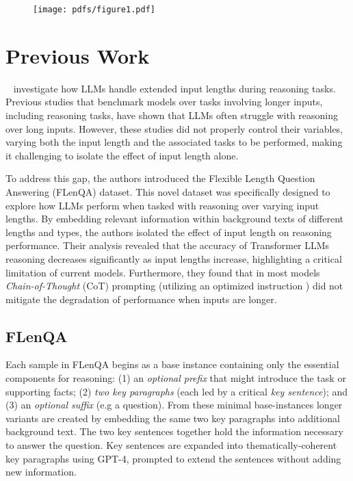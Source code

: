 \documentclass[11pt]{article}
\begin{document}
\begin{figure}\centering\texttt{[image: pdfs/figure1.pdf]}\end{figure}


\section{Previous Work}
~\citealp{levy-etal-2024-task} investigate how LLMs handle extended input lengths during reasoning tasks. Previous studies that benchmark models over tasks involving longer inputs, including reasoning tasks, have shown that LLMs often struggle with reasoning over long inputs. However, these studies did not properly control their variables, varying both the input length and the associated tasks to be performed, making it challenging to isolate the effect of input length alone.

To address this gap, the authors introduced the Flexible Length Question Answering (FLenQA) dataset. This novel dataset was specifically designed to explore how LLMs perform when tasked with reasoning over varying input lengths. By embedding relevant information within background texts of different lengths and types, the authors isolated the effect of input length on reasoning performance. Their analysis revealed that the accuracy of Transformer LLMs reasoning decreases significantly as input lengths increase, highlighting a critical limitation of current models.
Furthermore, they found that in most models \textit{Chain-of-Thought} (CoT) prompting \citep{kojima2022large,wei2022chain} (utilizing an optimized instruction \citep{zhou2022large}) did not mitigate the degradation of performance when inputs are longer.

\subsection{FLenQA}
Each sample in FLenQA begins as a base instance containing only the essential components for reasoning: (1) an \emph{optional prefix} that might introduce the task or supporting facts; (2) \emph{two key paragraphs} (each led by a critical \emph{key sentence}); and (3) an \emph{optional suffix} (e.g a question). From these minimal base-instances longer variants are created by embedding the same two key paragraphs into additional background text.
The two key sentences together hold the information necessary to answer the question.
Key sentences are expanded into thematically-coherent key paragraphs using GPT-4, prompted to extend the sentences without adding new information.
\end{document}
